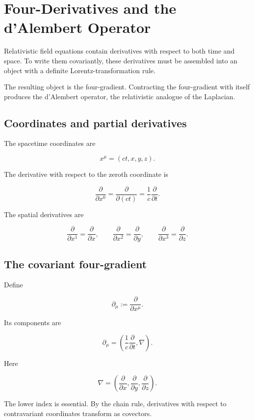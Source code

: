 \section{Four-Derivatives and the d'Alembert Operator}
\label{sec:four_derivatives_and_dalembert_operator}

Relativistic field equations contain derivatives with respect to both time and space. To write them covariantly, these derivatives must be assembled into an object with a definite Lorentz-transformation rule.

The resulting object is the four-gradient. Contracting the four-gradient with itself produces the d'Alembert operator, the relativistic analogue of the Laplacian.

\subsection{Coordinates and partial derivatives}

The spacetime coordinates are

\[
x^{\mu}=(ct,x,y,z).
\]

The derivative with respect to the zeroth coordinate is

\[
\frac{\partial}{\partial x^{0}}
=
\frac{\partial}{\partial(ct)}
=
\frac{1}{c}
\frac{\partial}{\partial t}.
\]

The spatial derivatives are

\[
\frac{\partial}{\partial x^{1}}
=
\frac{\partial}{\partial x},
\qquad
\frac{\partial}{\partial x^{2}}
=
\frac{\partial}{\partial y},
\qquad
\frac{\partial}{\partial x^{3}}
=
\frac{\partial}{\partial z}.
\]

\subsection{The covariant four-gradient}

Define

\[
\boxed{
\partial_{\mu}
:=
\frac{\partial}{\partial x^{\mu}}
}.
\]

Its components are

\[
\boxed{
\partial_{\mu}
=
\left(
\frac{1}{c}\frac{\partial}{\partial t},
\nabla
\right)
}.
\]

Here

\[
\nabla
=
\left(
\frac{\partial}{\partial x},
\frac{\partial}{\partial y},
\frac{\partial}{\partial z}
\right).
\]

The lower index is essential. By the chain rule, derivatives with respect to contravariant coordinates transform as covectors.

